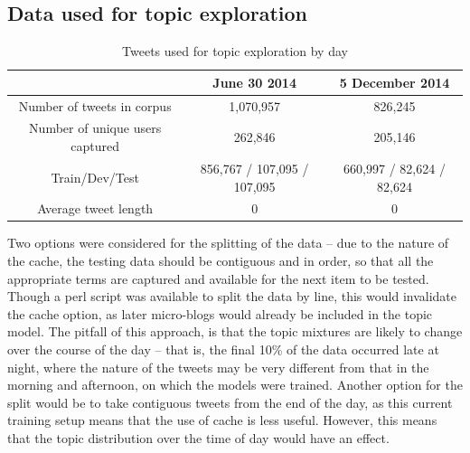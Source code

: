 \documentclass{article}
\begin{document}
\subsection{Data used for topic exploration}
\begin{table}
	\begin{tabular}{|c|c|c|}
	\hline
	& June 30 2014 & 5 December 2014 \\
	\hline
	Number of tweets in corpus & 1,070,957 & 826,245 \\
	Number of unique users captured & 262,846 & 205,146 \\ %
	Train/Dev/Test & 856,767 / 107,095 / 107,095 & 660,997 / 82,624 / 82,624 \\
	Average tweet length & 0 & 0\\
	\hline
	\end{tabular}
\caption{Tweets used for topic exploration by day}
\end{table} 

Two options were considered for the splitting of the data – due to the nature of the cache, the testing data should be contiguous and in order, so that all the appropriate terms are captured and available for the next item to be tested. Though a perl script was available to split the data by line, this would invalidate the cache option, as later micro-blogs would already be included in the topic model.
The pitfall of this approach, is that the topic mixtures are likely to change over the course of the day – that is, the final 10\% of the data occurred late at night, where the nature of the tweets may be very different from that in the morning and afternoon, on which the models were trained.  %
Another option for the split would be to take contiguous tweets from the end of the day, as this current training setup means that the use of cache is less useful. However, this means that the topic distribution over the time of day would have an effect.
\end{document}
